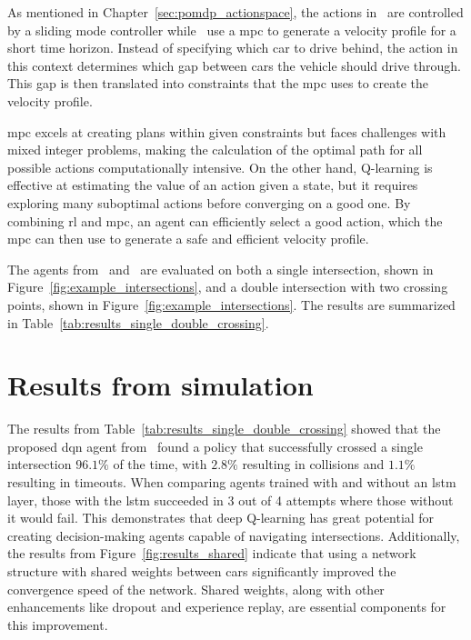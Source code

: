 As mentioned in Chapter~\ref{sec:pomdp_actionspace}, the actions in \paperLSTM \ are controlled by a sliding mode controller while \paperMPC \ use a \gls{mpc} to generate a velocity profile for a short time horizon. Instead of specifying which car to drive behind, the action in this context determines which gap between cars the vehicle should drive through. This gap is then translated into constraints that the \gls{mpc} uses to create the velocity profile.

\gls{mpc} excels at creating plans within given constraints but faces challenges with mixed integer problems, making the calculation of the optimal path for all possible actions computationally intensive. On the other hand, Q-learning is effective at estimating the value of an action given a state, but it requires exploring many suboptimal actions before converging on a good one. By combining \gls{rl} and \gls{mpc}, an agent can efficiently select a good action, which the \gls{mpc} can then use to generate a safe and efficient velocity profile.

The agents from \paperLSTM \ and \paperMPC \ are evaluated on both a single intersection, shown in Figure~\ref{fig:example_intersections}, and a double intersection with two crossing points, shown in Figure~\ref{fig:example_intersections}. The results are summarized in Table~\ref{tab:results_single_double_crossing}.

\section{Results from simulation}
\label{sec:results_dqn}
The results from Table~\ref{tab:results_single_double_crossing} showed that the proposed \gls{dqn} agent from \paperLSTM \ found a policy that successfully crossed a single intersection $96.1\%$ of the time, with $2.8\%$ resulting in collisions and $1.1\%$ resulting in timeouts. 
When comparing agents trained with and without an \gls{lstm} layer, those with the \gls{lstm} succeeded in 3 out of 4 attempts where those without it would fail.
This demonstrates that deep Q-learning has great potential for creating decision-making agents capable of navigating intersections. Additionally, the results from Figure~\ref{fig:results_shared} indicate that using a network structure with shared weights between cars significantly improved the convergence speed of the network. Shared weights, along with other enhancements like dropout and experience replay, are essential components for this improvement.


